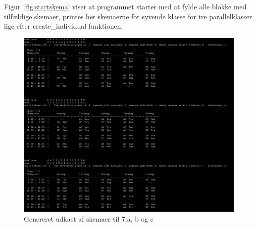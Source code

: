 Figur~\ref{fig:startskema} viser at programmet starter med at fylde alle blokke med tilfældige skemaer, printes her skemaerne for syvende klasse for tre parallelklasser lige efter create\_individual funktionen.
\begin{figure}[h]
  \centering
  \includegraphics[width=\textwidth]{partials/graphics/startsskema.png}
  \caption{Genereret udkast af skemaer til 7.a, b og c }
  \label{fig:startsskema}
\end{figure}